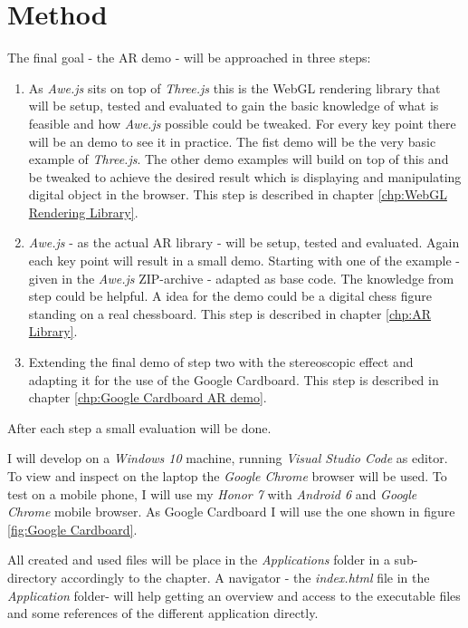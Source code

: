 \section{Method}

The final goal - the AR demo - will be approached in three steps:

\begin{enumerate}
\item  As \textit{Awe.js} sits on top of \textit{Three.js} this is the WebGL rendering library that will be setup, tested and evaluated to gain the basic knowledge of what is feasible and how \textit{Awe.js} possible could be tweaked. For every key point there will be an demo to see it in practice. The fist demo will be the very basic example of \textit{Three.js}. The other demo examples will build on top of this and be tweaked to achieve the desired result which is displaying and manipulating digital object in the browser. This step is described in chapter \ref{chp:WebGL Rendering Library}.

\item \textit{Awe.js} - as the actual AR library - will be setup, tested and evaluated. Again each key point will result in a small demo. Starting with one of the example - given in the \textit{Awe.js} ZIP-archive - adapted as base code. The knowledge from step could be helpful. A idea for the demo could be a digital chess figure standing on a real chessboard. This step is described in chapter \ref{chp:AR Library}.

\item Extending the final demo of step two with the stereoscopic effect and adapting it for the use of the Google Cardboard. This step is described in chapter \ref{chp:Google Cardboard AR demo}.

\end{enumerate}
After each step a small evaluation will be done.


I will develop on a \textit{Windows 10} machine, running \textit{Visual Studio Code} as editor. To view and inspect on the laptop the \textit{Google Chrome} browser will be used. To test on a mobile phone, I will use my \textit{Honor 7} with \textit{Android 6} and \textit{Google Chrome} mobile browser. As Google Cardboard I will use the one shown in figure \ref{fig:Google Cardboard}.

All created and used files will be place in the \textit{Applications} folder in a sub-directory accordingly to the chapter. A navigator - the \textit{index.html} file in the  \textit{Application} folder- will help getting an overview and access to the executable files and some references of the different application directly.


